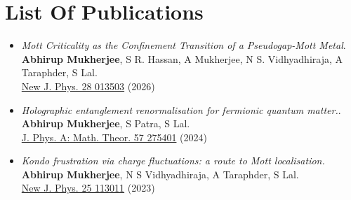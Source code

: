 \chapter*{List Of Publications}

\begin{itemize}
	\item[1.] {\it Mott Criticality as the Confinement Transition of a Pseudogap-Mott Metal}.\\ {\bf Abhirup Mukherjee}, S R. Hassan, A Mukherjee, N S. Vidhyadhiraja, A Taraphder, S Lal.\\ \href{https://iopscience.iop.org/article/10.1088/1367-2630/ae36c8}{New J. Phys. 28 013503} (2026)
	\item[2.] {\it Holographic entanglement renormalisation for fermionic quantum
		matter.}.\\ {\bf Abhirup Mukherjee}, S Patra, S Lal.\\ \href{https://dx.doi.org/10.1088/1751-8121/ad56e1}{J. Phys. A: Math. Theor. 57 275401} (2024)
	\item[3.] {\it Kondo frustration via charge fluctuations: a
		route to Mott localisation.}\\ {\bf Abhirup Mukherjee}, N S Vidhyadhiraja, A Taraphder, S Lal.\\ \href{https://dx.doi.org/10.1088/1367-2630/ad08f3}{New J. Phys. 25 113011} (2023)
\end{itemize}

